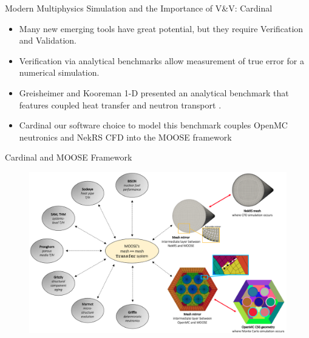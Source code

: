 \documentclass[9pt,t]{beamer}
\begin{document}
\begin{frame}{Modern Multiphysics Simulation and the Importance of V\&V: Cardinal}
    \pause
    \begin{itemize}
        \item<2-> Many new emerging tools have great potential, but they require Verification and Validation.
        \item<3-> Verification via analytical benchmarks allow measurement of true error for a numerical simulation.
        \item<4-> Greisheimer and Kooreman 1-D presented an analytical benchmark that features coupled heat transfer and neutron transport \cite{analytical-benchmark}.
        \item<5-> Cardinal \cite{novak2022-cardinal} our software choice to model this benchmark couples OpenMC \cite{openmc} neutronics and NekRS \cite{nekrs} CFD into the MOOSE framework \cite{lindsay2022moose}
    \end{itemize}
\end{frame}

\begin{frame}{Cardinal and MOOSE Framework}
    \begin{figure}[H]
        \centering
        \includegraphics[width=0.9\linewidth]{figures/framework.png}
    \end{figure}
\end{frame}


\end{document}
